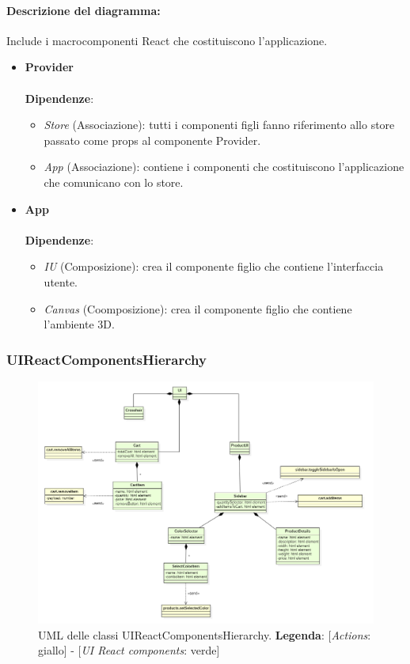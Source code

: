 \paragraph*{Descrizione del diagramma:}
Include i macrocomponenti React che costituiscono l'applicazione.
\begin{itemize}
		\item \textbf{Provider}
		\\\\
		\textbf{Dipendenze}:
		\begin{itemize}
			\item \textit{Store} (Associazione): tutti i componenti figli fanno riferimento allo store passato come props al 
			componente Provider.
			\item \textit{App} (Associazione): contiene i componenti che costituiscono l'applicazione che comunicano con lo store.
		\end{itemize}

		\item \textbf{App}
		\\\\
		\textbf{Dipendenze}:
		\begin{itemize}
			\item \textit{IU} (Composizione): crea il componente figlio che contiene l'interfaccia utente.
			\item \textit{Canvas} (Coomposizione): crea il componente figlio che contiene l'ambiente 3D.
		\end{itemize}
\end{itemize}

		
\begin{landscape}
\thispagestyle{empty}
\subsubsection{UIReactComponentsHierarchy}
\begin{figure}[H]
	\centering
	\includegraphics[scale=0.7, keepaspectratio]{./res/images/UIReactComponentsHierarchy.PNG}
	\caption[UML delle classi UIReactComponentsHierarchy]{
	UML delle classi UIReactComponentsHierarchy.
	\textbf{Legenda}: 
	[\textit{Actions}: giallo] -
	[\textit{UI React components}: verde]}
\end{figure}
\end{landscape}
\restoregeometry
